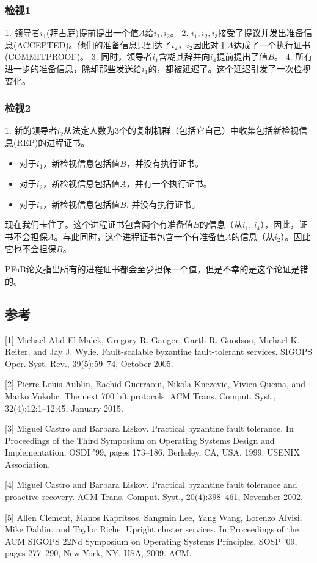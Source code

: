 \documentclass[UTF8]{ctexart}
\begin{document}
\subsubsection*{检视1}
1. 领导者$i_1$(拜占庭)提前提出一个值$A$给$i_2, i_3$。
2. $i_1, i_2, i_3$接受了提议并发出准备信息(ACCEPTED)。他们的准备信息只到达了$i_2$，$i_2$因此对于$A$达成了一个执行证书(COMMITPROOF)。
3. 同时，领导者$i_1$含糊其辞并向$i_4$提前提出了值$B$。
4. 所有进一步的准备信息，除却那些发送给$i_1$的，都被延迟了。这个延迟引发了一次检视变化。
\subsubsection*{检视2}
1. 新的领导者$i_2$从法定人数为$3$个的复制机群（包括它自己）中收集包括新检视信息(REP)的进程证书。
\begin{itemize}
	\item 对于$i_1$，新检视信息包括值$B$，并没有执行证书。
	\item 对于$i_2$，新检视信息包括值$A$，并有一个执行证书。
	\item 对于$i_4$，新检视信息包括值$B$, 并没有执行证书。
\end{itemize}
现在我们卡住了。这个进程证书包含两个有准备值$B$的信息（从$i_1$, $i_4$），因此，证书不会担保$A$。与此同时，这个进程证书包含一个有准备值$A$的信息（从$i_2$）。因此它也不会担保$B$。

PFaB论文指出所有的进程证书都会至少担保一个值，但是不幸的是这个论证是错的。
\subsection*{参考}
[1] Michael Abd-El-Malek, Gregory R. Ganger, Garth R. Goodson, Michael K. Reiter, and Jay J. Wylie. Fault-scalable byzantine fault-tolerant services. SIGOPS Oper. Syst. Rev., 39(5):59–74, October 2005.

[2] Pierre-Louis Aublin, Rachid Guerraoui, Nikola Knezevic, Vivien Quema, and Marko Vukolic. The next 700 bft protocols. ACM Trans. Comput. Syst., 32(4):12:1–12:45, January 2015.

[3] Miguel Castro and Barbara Liskov. Practical byzantine fault tolerance. In Proceedings of the Third Symposium on Operating Systems Design and Implementation, OSDI ’99, pages 173–186, Berkeley, CA, USA, 1999. USENIX Association.

[4] Miguel Castro and Barbara Liskov. Practical byzantine fault tolerance and proactive recovery. ACM Trans. Comput. Syst., 20(4):398–461, November 2002.

[5] Allen Clement, Manos Kapritsos, Sangmin Lee, Yang Wang, Lorenzo Alvisi, Mike Dahlin, and Taylor Riche. Upright cluster services. In Proceedings of the ACM SIGOPS 22Nd Symposium on Operating Systems Principles, SOSP ’09, pages 277–290, New York, NY, USA, 2009. ACM.
\end{document}
